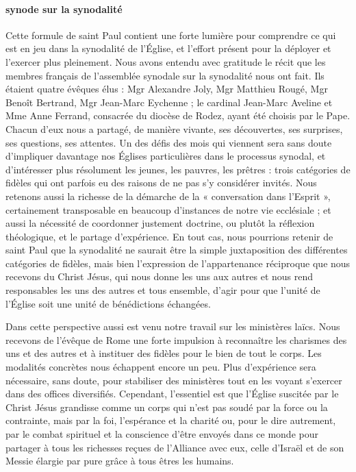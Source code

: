  \paragraph{synode sur la synodalité}
Cette formule de saint Paul contient une forte lumière pour comprendre ce qui est en jeu dans la synodalité de l’Église, et l’effort présent pour la déployer et l’exercer plus pleinement. Nous avons entendu avec gratitude le récit que les membres français de l’assemblée synodale sur la synodalité nous ont fait. Ils étaient quatre évêques élus : Mgr Alexandre Joly, Mgr Matthieu Rougé, Mgr Benoît Bertrand, Mgr Jean-Marc Eychenne ; le cardinal Jean-Marc Aveline et Mme Anne Ferrand, consacrée du diocèse de Rodez, ayant été choisis par le Pape. Chacun d’eux nous a partagé, de manière vivante, ses découvertes, ses surprises, ses questions, ses attentes. Un des défis des mois qui viennent sera sans doute d’impliquer davantage nos Églises particulières dans le processus synodal, et d’intéresser plus résolument les jeunes, les pauvres, les prêtres : trois catégories de fidèles qui ont parfois eu des raisons de ne pas s’y considérer invités. Nous retenons aussi la richesse de la démarche de la
« conversation dans l’Esprit », certainement transposable en beaucoup d’instances de notre vie ecclésiale ; et aussi la nécessité de coordonner justement doctrine, ou plutôt la réflexion théologique, et le partage d’expérience. En tout cas, nous pourrions retenir de saint Paul que la synodalité ne saurait être la simple juxtaposition des différentes catégories de fidèles, mais bien l’expression de l’appartenance réciproque que nous recevons du Christ Jésus, qui nous donne les uns aux autres et nous rend responsables les uns des autres et tous ensemble, d’agir pour que l’unité de l’Église soit une unité de bénédictions échangées.


Dans cette perspective aussi est venu notre travail sur les ministères laïcs. Nous recevons de l’évêque de Rome une forte impulsion à reconnaître les charismes des uns et des autres et à instituer des fidèles pour le bien de tout le corps. Les modalités concrètes nous échappent encore un peu. Plus d’expérience sera nécessaire, sans doute, pour stabiliser des ministères tout en les voyant s’exercer dans des offices diversifiés. Cependant, l’essentiel est que l’Église suscitée par le Christ Jésus grandisse comme un corps qui n’est pas soudé par la force ou la contrainte, mais par la foi, l’espérance et la charité ou, pour le dire autrement, par le combat spirituel et la conscience d’être envoyés dans ce monde pour partager à tous les richesses reçues de l’Alliance avec eux, celle d’Israël et de son Messie élargie par pure grâce à tous êtres les humains.

